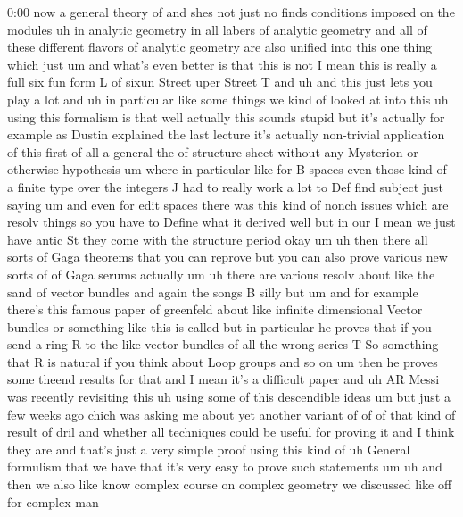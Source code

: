 \begin{unfinished}{0:00}
now  a  general
theory  of  and
shes  not  just  no  finds  conditions
imposed  on  the  modules  uh  in  analytic
geometry  in  all  labers  of  analytic
geometry  and  all  of  these  different
flavors  of  analytic  geometry  are  also
unified  into  this  one  thing  which
just
um  and  what's  even  better  is  that  this
is  not  I  mean  this  is  really  a  full  six
fun  form  L  of
sixun  Street  uper  Street
T  and
uh  and  this  just  lets  you  play  a  lot  and
uh  in  particular  like  some  things  we
kind
of  looked  at  into  this  uh  using  this
formalism  is
that  well  actually  this  sounds  stupid
but  it's  actually  for  example  as  Dustin
explained  the  last  lecture  it's  actually
non-trivial  application  of  this  first  of
all  a  general  the  of  structure
sheet  without  any  Mysterion  or  otherwise
hypothesis  um  where  in  particular  like
for  B  spaces  even  those  kind  of  a  finite
type  over  the  integers  J  had  to  really
work  a  lot  to  Def  find  subject  just
saying
um  and  even  for  edit  spaces  there  was
this  kind  of  nonch  issues  which  are
resolv  things
so  you  have  to  Define  what  it
derived  well  but  in  our  I  mean  we  just
have  antic  St  they  come  with  the
structure  period
okay  um
uh
then  there  all  sorts  of  Gaga  theorems
that  you  can  reprove  but  you  can  also
prove  various  new  sorts  of  of  Gaga
serums  actually
um  uh  there  are  various  resolv  about
like  the  sand  of  vector
bundles  and  again  the
songs  B  silly  but  um  and  for  example
there's  this  famous  paper  of  greenfeld
about  like  infinite  dimensional  Vector
bundles  or  something  like  this  is  called
but  in  particular  he  proves  that  if  you
send  a  ring  R  to  the  like  vector  bundles
of  all  the  wrong  series  T  So  something
that  R  is  natural  if  you  think  about
Loop  groups  and  so  on  um  then  he  proves
some  theend  results  for  that  and  I  mean
it's  a  difficult  paper  and  uh  AR  Messi
was  recently  revisiting  this  uh  using
some  of  this  descendible
ideas  um  but  just  a  few  weeks  ago  chich
was  asking  me  about  yet  another  variant
of  of  of  that  kind  of  result  of  dril  and
whether  all  techniques  could  be  useful
for  proving  it  and  I  think  they  are  and
that's  just  a  very  simple  proof  using
this  kind  of  uh  General  formulism  that
we  have  that  it's  very  easy  to  prove
such
statements
um  uh  and  then  we  also  like  know  complex
course  on  complex  geometry  we
discussed
like  off  for  complex  man

\end{unfinished}
